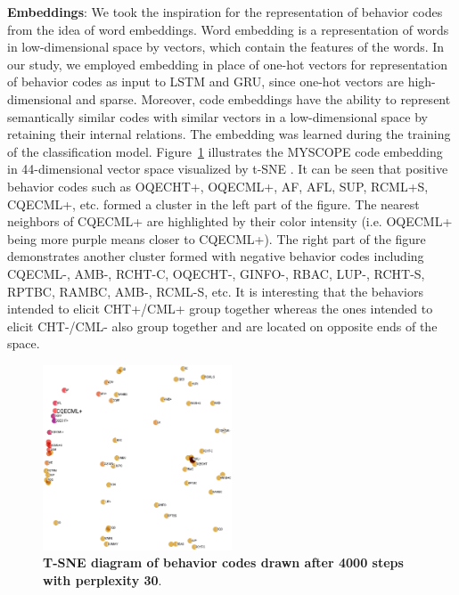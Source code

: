 \documentclass{amia_summit_2018}
\begin{document}
\textbf {Embeddings}: We took the inspiration for the representation of behavior codes from the idea of word embeddings\cite{bengio2003neural}. Word embedding is a representation of words in
low-dimensional space by vectors, which contain the features of the words. In our study, we employed embedding in place of one-hot vectors for representation of behavior codes as input to LSTM and
GRU, since one-hot vectors are high-dimensional and sparse. Moreover, code embeddings have the ability to represent semantically similar codes with similar vectors in a low-dimensional space by
retaining their internal relations. The embedding was learned during the training of the classification model. Figure~\ref{fig:code_embedding} illustrates the MYSCOPE code embedding in 44-dimensional
vector space visualized by t-SNE \cite{maaten2008visualizing}. It can be seen that positive behavior codes such as OQECHT+, OQECML+, AF, AFL, SUP, RCML+S, CQECML+, etc. formed a cluster in the left
part of the figure. The nearest neighbors of CQECML+ are highlighted by their color intensity (i.e. OQECML+ being more purple means closer to CQECML+). The right part of the figure demonstrates
another cluster formed with negative behavior codes including CQECML-, AMB-, RCHT-C, OQECHT-, GINFO-, RBAC, LUP-, RCHT-S, RPTBC, RAMBC, AMB-, RCML-S, etc. It is interesting that the behaviors intended
to elicit CHT+/CML+ group together whereas the ones intended to elicit CHT-/CML- also group together and are located on opposite ends of the space. 
    
\begin{figure}[!htb]
    \centering
    \includegraphics[width=0.50\textwidth]{figures/code_embed.eps}
    \caption{\textbf{T-SNE diagram of behavior codes drawn after 4000 steps with perplexity 30}.}
    \label{fig:code_embedding}
\end{figure}
\end{document}
